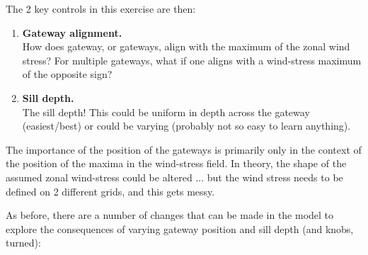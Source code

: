 \documentclass[11pt,fleqn]{book} %
\begin{document}
The 2 key controls in this exercise are then:

\vspace{2mm}
\begin{enumerate}
\item \textbf{Gateway alignment.}
\\How does gateway, or gateways, align with the maximum of the zonal wind stress? For multiple gateways, what if one aligns with a wind-stress maximum of the opposite sign?
\vspace{2mm}
\item \textbf{Sill depth.}
\\The sill depth! This could be uniform in depth across the gateway (easiest/best) or could be varying (probably not so easy to learn anything).
\end{enumerate}
\vspace{2mm}

The importance of the position of the gateways is primarily only in the context of the position of the maxima in the wind-stress field. In theory, the shape of the assumed zonal wind-stress could be altered ... but the wind stress needs to be defined on 2 different grids, and this gets messy.

As before, there are a number of changes that can be made in the model to explore the consequences of varying gateway position and sill depth (and knobs, turned):
\end{document}
